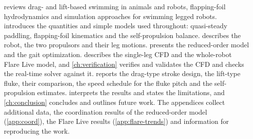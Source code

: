  reviews drag- and lift-based swimming in animals and robots, flapping-foil hydrodynamics
and simulation approaches for swimming legged robots.  introduces the quantities and
simple models used throughout: quasi-steady paddling, flapping-foil kinematics and the self-propulsion
balance.  describes the robot, the two propulsors and their leg motions.
 presents the reduced-order model and the gait optimization.  describes the
single-leg CFD and the whole-robot Flare Live model, and \cref{ch:verification} verifies and validates the CFD and
checks the real-time solver against it.  reports the drag-type stroke design, the lift-type fluke,
their comparison, the speed schedule for the fluke pitch and the self-propulsion estimates.
 interprets the results and states the limitations, and \cref{ch:conclusion} concludes
and outlines future work. The appendices collect additional data, the coordination results of the reduced-order model
(\cref{app:coord}), the Flare Live results (\cref{app:flare-trends}) and information for reproducing the work.
